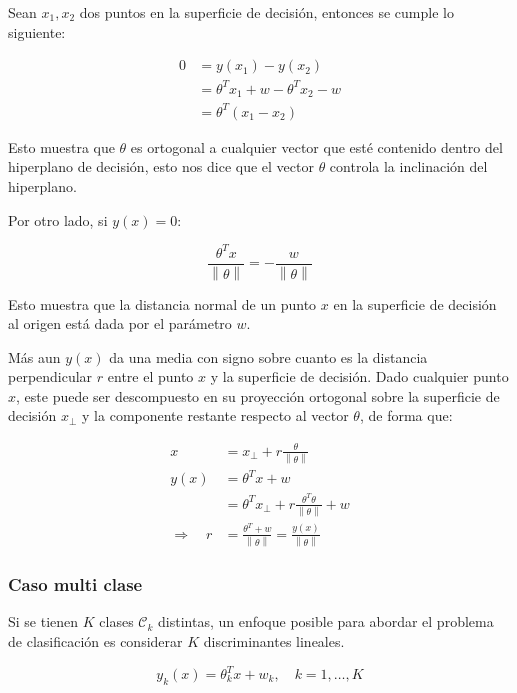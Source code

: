 Sean $x_1,x_2$ dos puntos en la superficie de decisión, entonces se cumple lo siguiente:

\begin{align}
    0 &= y(x_1) - y(x_2) \nonumber\\
      &= \theta^Tx_1 + w - \theta^Tx_2 - w \nonumber\\
      &= \theta^T(x_1-x_2)
\end{align}

Esto muestra que $\theta$ es ortogonal a cualquier vector que esté contenido dentro del hiperplano de decisión, esto nos dice que el vector $\theta$ controla la inclinación del hiperplano.

Por otro lado, si $y(x)=0$:

\begin{equation}
    \frac{\theta^Tx}{\left \| \theta \right \|} = -\frac{w}{\left \| \theta \right \|}
\end{equation}

Esto muestra que la distancia normal de un punto $x$ en la superficie de decisión al origen está dada por el parámetro $w$.

Más aun $y(x)$ da una media con signo sobre cuanto es la distancia perpendicular $r$ entre el punto $x$ y la superficie de decisión. Dado cualquier punto $x$, este puede ser descompuesto en su proyección ortogonal sobre la superficie de decisión $x_{\bot}$ y la componente restante respecto al vector $\theta$, de forma que:

\begin{align}
    x &= x_{\bot}+r\frac{\theta}{\left \| \theta \right \|}\\
    y(x) &= \theta^Tx+w\\
    &= \theta^Tx_{\bot} + r\frac{\theta^T\theta}{\left \| \theta \right \|} + w\\
    \Rightarrow \quad r &= \frac{\theta^T+w}{\left \| \theta \right \|} 
    = \frac{y(x)}{\left \| \theta \right \|}
\end{align}

\newpage
\subsubsection{Caso multi clase}

Si se tienen $K$ clases $\mathcal{C}_k$ distintas, un enfoque posible para abordar el problema de clasificación es considerar $K$ discriminantes lineales.

\begin{equation}
    y_k(x) = \theta_k^Tx + w_k, \quad k=1,\ldots,K
\end{equation}

